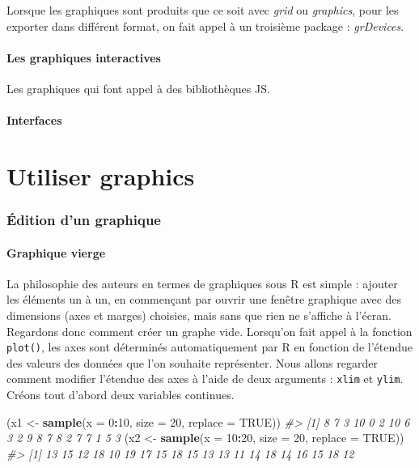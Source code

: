 \documentclass[]{article}
\newenvironment{Shaded}{\begin{snugshade}}{\end{snugshade}}
\newcommand{\CommentTok}[1]{\textcolor[rgb]{0.56,0.35,0.01}{\textit{#1}}}
\newcommand{\DataTypeTok}[1]{\textcolor[rgb]{0.13,0.29,0.53}{#1}}
\newcommand{\DecValTok}[1]{\textcolor[rgb]{0.00,0.00,0.81}{#1}}
\newcommand{\KeywordTok}[1]{\textcolor[rgb]{0.13,0.29,0.53}{\textbf{#1}}}
\newcommand{\NormalTok}[1]{#1}
\newcommand{\OperatorTok}[1]{\textcolor[rgb]{0.81,0.36,0.00}{\textbf{#1}}}
\newcommand{\OtherTok}[1]{\textcolor[rgb]{0.56,0.35,0.01}{#1}}
\newcommand{\StringTok}[1]{\textcolor[rgb]{0.31,0.60,0.02}{#1}}
\begin{document}
Lorsque les graphiques sont produits que ce soit avec \emph{grid} ou \emph{graphics}, pour les exporter dans différent format, on fait appel à un troisième package : \emph{grDevices}.

\hypertarget{les-graphiques-interactives}{%
\subsection{Les graphiques interactives}\label{les-graphiques-interactives}}

Les graphiques qui font appel à des bibliothèques JS.

\hypertarget{interfaces}{%
\subsection{Interfaces}\label{interfaces}}

\hypertarget{part-utiliser-graphics}{%
\part{Utiliser graphics}\label{part-utiliser-graphics}}

\hypertarget{uxe9dition-dun-graphique}{%
\section{Édition d'un graphique}\label{uxe9dition-dun-graphique}}

\hypertarget{graphique-vierge}{%
\subsection{Graphique vierge}\label{graphique-vierge}}

La philosophie des auteurs en termes de graphiques sous R est simple : ajouter les éléments un à un, en commençant par ouvrir une fenêtre graphique avec des dimensions (axes et marges) choisies, mais sans que rien ne s'affiche à l'écran. Regardons donc comment créer un graphe vide.
Lorsqu'on fait appel à la fonction \texttt{plot()}, les axes sont déterminés automatiquement par R en fonction de l'étendue des valeurs des données que l'on souhaite représenter. Nous allons regarder comment modifier l'étendue des axes à l'aide de deux arguments : \texttt{xlim} et \texttt{ylim}.
Créons tout d'abord deux variables continues.

\begin{Shaded}
\begin{Highlighting}[]
\NormalTok{(x1 <-}\StringTok{ }\KeywordTok{sample}\NormalTok{(}\DataTypeTok{x =} \DecValTok{0}\OperatorTok{:}\DecValTok{10}\NormalTok{, }\DataTypeTok{size =} \DecValTok{20}\NormalTok{, }\DataTypeTok{replace =} \OtherTok{TRUE}\NormalTok{))}
\CommentTok{#>  [1]  8  7  3 10  0  2 10  6  3  2  9  8  7  8  2  7  7  1  5  3}
\NormalTok{(x2 <-}\StringTok{ }\KeywordTok{sample}\NormalTok{(}\DataTypeTok{x =} \DecValTok{10}\OperatorTok{:}\DecValTok{20}\NormalTok{, }\DataTypeTok{size =} \DecValTok{20}\NormalTok{, }\DataTypeTok{replace =} \OtherTok{TRUE}\NormalTok{))}
\CommentTok{#>  [1] 13 15 12 18 10 19 17 15 18 15 13 13 11 14 18 14 16 15 18 12}
\end{Highlighting}
\end{Shaded}
\end{document}
